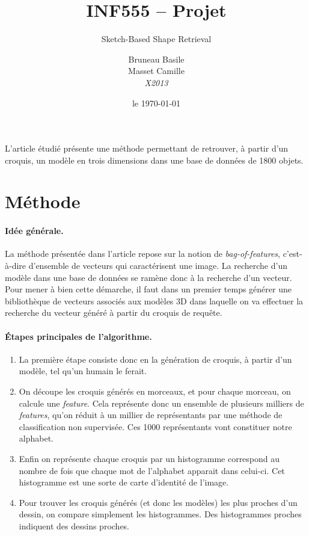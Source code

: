 \documentclass[12pt, a4paper, oneside]{article}
\title{INF555 -- Projet}
\subtitle{Sketch-Based Shape Retrieval}
\date{le \today}
\author{Bruneau Basile\\Masset Camille\\\emph{X2013}}
\begin{document}
\renewcommand{\labelitemi}{\starredbullet}

\maketitle


L'article étudié présente une méthode permettant de retrouver, à partir d'un croquis, un modèle en trois dimensions dans une base de données de \num{1800} objets.

\section{Méthode}

\paragraph{Idée générale.}
La méthode présentée dans l'article repose sur la notion de \emph{bag-of-features}, c'est-à-dire d'ensemble de vecteurs qui caractérisent une image.
La recherche d'un modèle dans une base de données se ramène donc à la recherche d'un vecteur.
Pour mener à bien cette démarche, il faut dans un premier temps générer une bibliothèque de vecteurs associés aux modèles 3D dans laquelle on va effectuer la recherche du vecteur généré à partir du croquis de requête.

\paragraph{Étapes principales de l'algorithme.}
\begin{enumerate}
    \item La première étape consiste donc en la génération de croquis, à partir d'un modèle, tel qu'un humain le ferait.
    \item On découpe les croquis générés en morceaux, et pour chaque morceau, on calcule une \emph{feature}.
    Cela représente donc un ensemble de plusieurs milliers de \emph{features}, qu'on réduit à un millier de représentants par une méthode de classification non supervisée.
    Ces \num{1000} représentants vont constituer notre alphabet.
    \item Enfin on représente chaque croquis par un histogramme correspond au nombre de fois que chaque mot de l'alphabet apparait dans celui-ci.
    Cet histogramme est une sorte de carte d'identité de l'image.
    \item Pour trouver les croquis générés (et donc les modèles) les plus proches d'un dessin, on compare simplement les histogrammes.
    Des histogrammes proches indiquent des dessins proches.
\end{enumerate}
\end{document}
